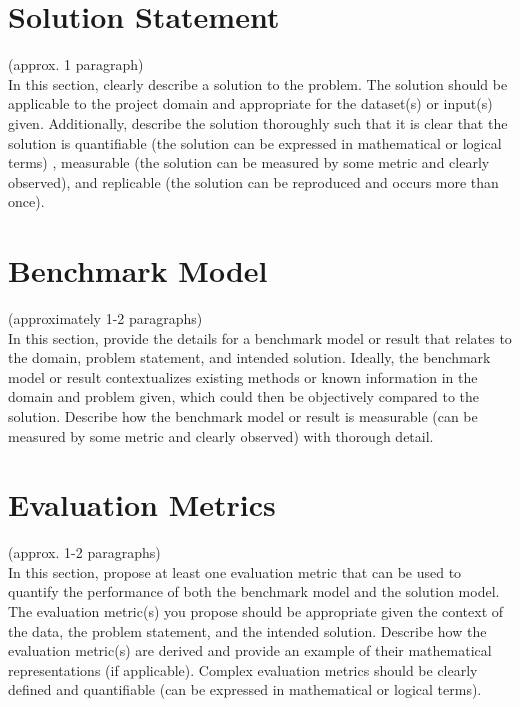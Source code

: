 \documentclass[a4paper, 11pt]{article}
\begin{document}
\section*{Solution Statement}
(approx. 1 paragraph) \\
In this section, clearly describe a solution to the problem. 
The solution should be applicable to the project domain and appropriate for the dataset(s) or input(s) given. 
Additionally, describe the solution thoroughly such that it is clear that the solution is quantifiable (the solution can be expressed in mathematical or logical terms) , measurable (the solution can be measured by some metric and clearly observed), and replicable (the solution can be reproduced and occurs more than once).


\section*{Benchmark Model}
(approximately 1-2 paragraphs) \\
In this section, provide the details for a benchmark model or result that relates to the domain, problem statement, and intended solution.
Ideally, the benchmark model or result contextualizes existing methods or known information in the domain and problem given, which could then be objectively compared to the solution. 
Describe how the benchmark model or result is measurable (can be measured by some metric and clearly observed) with thorough detail.


\section*{Evaluation Metrics}
(approx. 1-2 paragraphs) \\
In this section, propose at least one evaluation metric that can be used to quantify the performance of both the benchmark model and the solution model.
The evaluation metric(s) you propose should be appropriate given the context of the data, the problem statement, and the intended solution.
Describe how the evaluation metric(s) are derived and provide an example of their mathematical representations (if applicable).
Complex evaluation metrics should be clearly defined and quantifiable (can be expressed in mathematical or logical terms).
\end{document}

